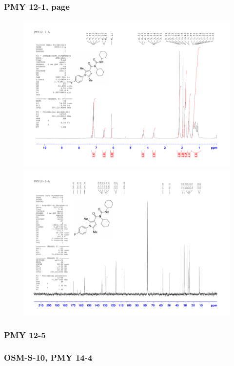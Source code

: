 \documentclass[12pt, a4paper,titlepage]{article}
\begin{document}
{\subsubsection*{PMY 12-1, page \pageref{exp:PMY12-1}}
\label{spec:PMY12-1}
	\begin{figure}[H] 
	\begin{center}
	\includegraphics[width=14.5cm]{expdata/PMY12-1/1H}
	\includegraphics[width=14.5cm]{expdata/PMY12-1/13C}
	\end{center}
	\end{figure}

\subsubsection*{PMY 12-5}

\subsubsection*{OSM-S-10, PMY 14-4}

}
\end{document}
